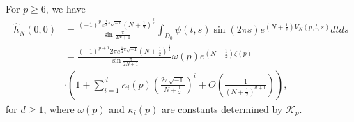 \documentclass[12pt]{amsart}
\begin{document}
\begin{proposition} \label{prop-m0n0} 
For $p\geq 6$,  we have
\begin{align}
    \hat{h}_N(0,0)&=\frac{(-1)^pe^{\frac{1}{4}\pi\sqrt{-1}}(N+\frac{1}{2})^{\frac{3}{2}}}{\sin \frac{\pi}{2N+1}}\int_{D_0}\psi(t,s)\sin(2\pi s)e^{(N+\frac{1}{2})V_N(p,t,s)}dtds\\\nonumber
    &=\frac{(-1)^{p+1}2\pi e^{\frac{1}{4}\pi\sqrt{-1}} (N+\frac{1}{2})^{\frac{1}{2}}}{\sin \frac{\pi}{2N+1}}\omega(p)e^{(N+\frac{1}{2})\zeta(p)}\\\nonumber
&\cdot\left(1+\sum_{i=1}^d\kappa_i(p)\left(\frac{2\pi\sqrt{-1}}{N+\frac{1}{2}}\right)^i+O\left(\frac{1}{(N+\frac{1}{2})^{d+1}}\right)\right),
    \end{align}
    for $d\geq 1$, where $\omega(p)$ and $\kappa_i(p)$ are constants determined by $\mathcal{K}_p$.
\end{proposition}
\end{document}
